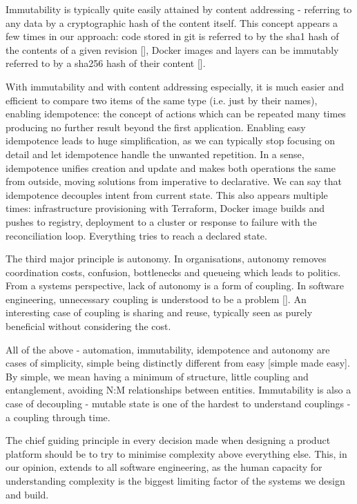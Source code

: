 \documentclass[reprint,amsmath,amssymb,aps]{revtex4-1}
\begin{document}
Immutability is typically quite easily attained by content addressing - referring to any data by a cryptographic hash of the content itself. This concept appears a few times in our approach: code stored in git is referred to by the sha1 hash of the contents of a given revision [], Docker images and layers can be immutably referred to by a sha256 hash of their content []. 

With immutability and with content addressing especially, it is much easier and efficient to compare two items of the same type (i.e. just by their names), enabling idempotence: the concept of actions which can be repeated many times producing no further result beyond the first application. Enabling easy idempotence leads to huge simplification, as we can typically stop focusing on detail and let idempotence handle the unwanted repetition. In a sense, idempotence unifies creation and update and makes both operations the same from outside, moving solutions from imperative to declarative. We can say that idempotence decouples intent from current state. This also appears multiple times: infrastructure provisioning with Terraform, Docker image builds and pushes to registry, deployment to a cluster or response to failure with the reconciliation loop. Everything tries to reach a declared state.

The third major principle is autonomy. In organisations, autonomy removes coordination costs, confusion, bottlenecks and queueing which leads to politics. From a systems perspective, lack of autonomy is a form of coupling. In software engineering, unnecessary coupling is understood to be a problem []. An interesting case of coupling is sharing and reuse, typically seen as purely beneficial without considering the cost. 

All of the above - automation, immutability, idempotence and autonomy are cases of simplicity, simple being distinctly different from easy [simple made easy]. By simple, we mean having a minimum of structure, little coupling and entanglement, avoiding N:M relationships between entities. Immutability is also a case of decoupling - mutable state is one of the hardest to understand couplings - a coupling through time.

The chief guiding principle in every decision made when designing a product platform should be to try to minimise complexity above everything else. This, in our opinion, extends to all software engineering, as the human capacity for understanding complexity is the biggest limiting factor of the systems we design and build.
\end{document}
